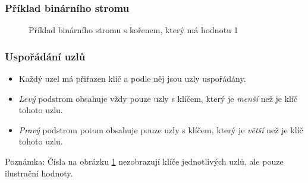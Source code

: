 \documentclass[10pt,xcolor=pdflatex,hyperref={unicode}]{beamer}
\begin{document}
\begin{frame}\frametitle{Příklad binárního stromu}

    \begin{figure}[ht]
        \centering
        \caption{Příklad binárního stromu s kořenem, který má hodnotu 1}
        \label{imgBinaryTree}
    \end{figure}
    
\end{frame}

\begin{frame}\frametitle{Uspořádání uzlů}

    \begin{itemize}
        \item Každý uzel má přiřazen klíč a podle něj jsou uzly uspořádány.
        \item \emph{Levý} podstrom obsahuje vždy pouze uzly s klíčem, který je \emph{menší} než je klíč tohoto uzlu.
        \item \emph{Pravý} podstrom potom obsahuje pouze uzly s klíčem, který je \emph{větší} než je klíč tohoto uzlu.
    \end{itemize}
    
    \begin{alertblock}{Poznámka:}
        Čísla na obrázku \ref{imgBinaryTree} nezobrazují klíče jednotlivých uzlů, ale pouze ilustrační hodnoty.
    \end{alertblock}

\end{frame}
\end{document}
